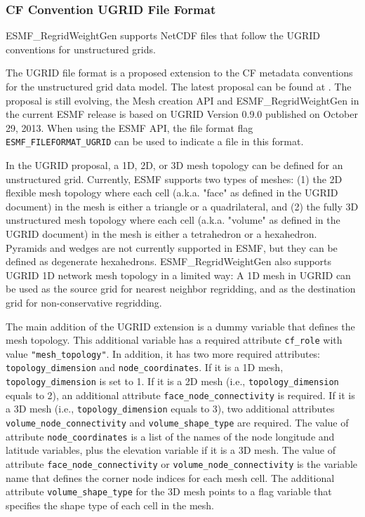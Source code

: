 \subsubsection{CF Convention UGRID File Format}\label{sec:fileformat:ugrid}

ESMF\_RegridWeightGen supports NetCDF files that follow the UGRID conventions for unstructured grids.

The UGRID file format is a proposed extension to the CF metadata conventions for the unstructured grid data model. The latest proposal can be found at .  The proposal is still evolving, the Mesh creation API and ESMF\_RegridWeightGen in the current ESMF release is based on UGRID Version 0.9.0 published on October 29, 2013. When using the ESMF API, the file format flag {\tt ESMF\_FILEFORMAT\_UGRID} can be used to indicate a file in this format.

In the UGRID proposal, a 1D, 2D, or 3D mesh topology can be defined for an unstructured grid.  Currently, ESMF
supports two types of meshes: (1) the 2D flexible mesh topology where each cell (a.k.a. "face" as defined in the UGRID document) in the mesh is either a triangle or a quadrilateral, and (2) the fully 3D unstructured mesh topology where each cell (a.k.a. "volume" as defined in the UGRID document) in the mesh
is either a tetrahedron or a hexahedron.  Pyramids and wedges are not currently supported in ESMF, but they
can be defined as degenerate hexahedrons.   ESMF\_RegridWeightGen also
supports UGRID 1D network mesh topology in a limited way:  A 1D mesh in UGRID
can be used as the source grid for nearest neighbor regridding, and as the
destination grid for non-conservative regridding.  

The main addition of the UGRID extension is a dummy variable that defines the mesh
topology.  This additional variable has a required attribute {\tt cf\_role}
with value {\tt "mesh\_topology"}.  In addition, it has two more required attributes: {\tt topology\_dimension}
and {\tt node\_coordinates}.  If it is a 1D mesh, {\tt topology\_dimension} is
set to 1.  
If it is a 2D mesh (i.e., {\tt topology\_dimension} equals to 2), an additional attribute
{\tt face\_node\_connectivity} is required.  If it is a 3D mesh (i.e., {\tt topology\_dimension} equals to 3), two additional attributes {\tt volume\_node\_connectivity} and {\tt volume\_shape\_type} are required.
The value of attribute {\tt node\_coordinates} is a list of the names of the node longitude and latitude variables,
plus the elevation variable if it is a 3D mesh.
The value of attribute {\tt face\_node\_connectivity} or {\tt volume\_node\_connectivity} is the variable name that defines the corner node indices for each mesh cell. The additional attribute {\tt volume\_shape\_type} for the
3D mesh points to a flag variable that specifies the shape type of each cell in the mesh.

